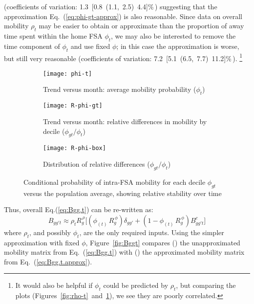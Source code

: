 (coefficients of variation: 1.3~[0.8~(1.1,~2.5)~4.4]\%\,)
suggesting that the approximation Eq.~(\ref{eq:phi-gt-approx}) is also reasonable.
Since data on overall mobility $\rho_{t}$ may be easier to obtain or approximate than
the proportion of away time spent within the home FSA $\phi_{t}$,
we may also be interested to remove the time component of $\phi_{t}$ and use fixed $\phi$;
in this case the approximation is worse, but still very reasonable
(coefficients of variation: 7.2~[5.1~(6.5,~7.7)~11.2]\%\,).%
\footnote{It would also be helpful if $\phi_{t}$ could be predicted by $\rho_{t}$,
  but comparing the plots (Figures~\ref{fig:rho-t}~and~\ref{fig:phi-t}),
  we see they are poorly correlated.}
\begin{figure}[ht]
  \begin{subfigure}[t]{0.297\linewidth}
    \texttt{[image: phi-t]}
    \caption{Trend versus month: average mobility probability ($\phi_{t}$)}
    \label{fig:phi-t}
  \end{subfigure}\hfill
  \begin{subfigure}[t]{0.33\linewidth}
    \texttt{[image: R-phi-gt]}
    \caption{Trend versus month: relative differences in mobility by decile ($\phi_{gt} / \phi_{t}$)}
    \label{fig:phi-gt}
  \end{subfigure}\hfill
  \begin{subfigure}[t]{0.33\linewidth}
    \texttt{[image: R-phi-box]}
    \caption{Distribution of relative differences ($\phi_{gt} / \phi_{t}$)}
    \label{fig:phi-box}
  \end{subfigure}
  \caption{Conditional probability of intra-FSA mobility for each decile $\phi_{gt}$
    versus the population average,
    showing relative stability over time}
  \label{fig:phi}
\end{figure}
\par
Thus, overall Eq.(\ref{eq:Bgg.t}) can be re-written as:
\begin{equation}\label{eq:Bgg.t.approx}
  B_{gg't} \approx \rho_{t} R^{\,\rho}_{g} \Big[
    (\phi_{(t)}\,R^{\,\phi}_{g}) \delta_{gg'} + (1-\phi_{(t)}\,R^{\,\phi}_{g}) B^c_{gg't}
  \Big]
\end{equation}
where $\rho_{t}$, and possibly $\phi_{t}$, are the only required inputs.
Using the simpler approximation with fixed $\phi$, Figure~\ref{fig:Bggt}
compares () the unapproximated mobility matrix from Eq.~(\ref{eq:Bgg.t})
with () the approximated mobility matrix from Eq.~(\ref{eq:Bgg.t.approx}).
